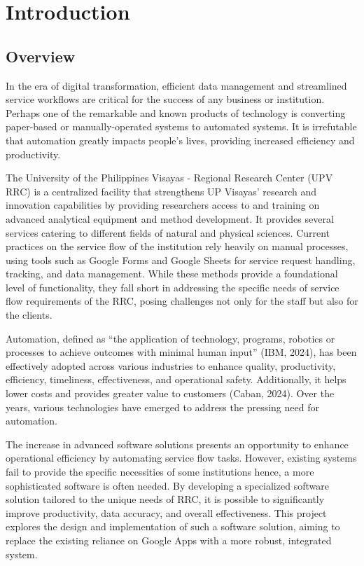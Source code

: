 \chapter{Introduction}
\label{sec:researchdesc}    %

\section{Overview}
\label{sec:overview}

In the era of digital transformation, efficient data management and streamlined service workflows are critical for the success of any business or institution. Perhaps one of the remarkable and known products of technology is converting paper-based or manually-operated systems to automated systems. It is irrefutable that automation greatly impacts people's lives, providing increased efficiency and productivity.

The University of the Philippines Visayas - Regional Research Center (UPV RRC) is a centralized facility that strengthens UP Visayas’ research and innovation capabilities by providing researchers access to and training on advanced analytical equipment and method development. It provides several services catering to different fields of natural and physical sciences. Current practices on the service flow of the institution rely heavily on manual processes, using tools such as Google Forms and Google Sheets for service request handling, tracking, and data management. While these methods provide a foundational level of functionality, they fall short in addressing the specific needs of service flow requirements of the RRC, posing challenges not only for the staff but also for the clients. 

Automation, defined as “the application of technology, programs, robotics or processes to achieve outcomes with minimal human input” (IBM, 2024), has been effectively adopted across various industries to enhance quality, productivity, efficiency, timeliness, effectiveness, and operational safety. Additionally, it helps lower costs and provides greater value to customers (Caban, 2024). Over the years, various technologies have emerged to address the pressing need for automation. 

The increase in advanced software solutions presents an opportunity to enhance operational efficiency by automating service flow tasks. However, existing systems fail to provide the specific necessities of some institutions hence, a more sophisticated software is often needed. By developing a specialized software solution tailored to the unique needs of RRC, it is possible to significantly improve productivity, data accuracy, and overall effectiveness. This project explores the design and implementation of such a software solution, aiming to replace the existing reliance on Google Apps with a more robust, integrated system.
  
